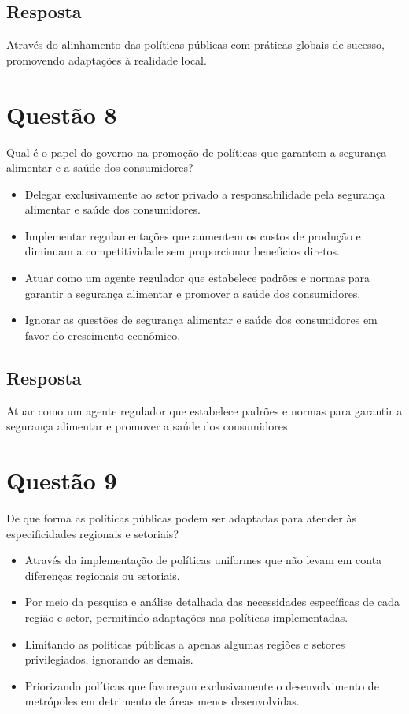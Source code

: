 \documentclass[
   article,       
   12pt,          
   oneside,       
   a4paper,       
   english,       
   brazil,        
   sumario=tradicional
   ]{abntex2}
\begin{document}
\subsection{Resposta}
Através do alinhamento das políticas públicas com práticas globais de sucesso, promovendo adaptações à realidade local.

\section{Questão 8}
Qual é o papel do governo na promoção de políticas que garantem a segurança alimentar e a saúde dos consumidores?

\begin{itemize}
  \item Delegar exclusivamente ao setor privado a responsabilidade pela segurança alimentar e saúde dos consumidores.
  \item Implementar regulamentações que aumentem os custos de produção e diminuam a competitividade sem proporcionar benefícios diretos.
  \item Atuar como um agente regulador que estabelece padrões e normas para garantir a segurança alimentar e promover a saúde dos consumidores.
  \item Ignorar as questões de segurança alimentar e saúde dos consumidores em favor do crescimento econômico.
\end{itemize}

\subsection{Resposta}
Atuar como um agente regulador que estabelece padrões e normas para garantir a segurança alimentar e promover a saúde dos consumidores.

\section{Questão 9}
De que forma as políticas públicas podem ser adaptadas para atender às especificidades regionais e setoriais?

\begin{itemize}
  \item Através da implementação de políticas uniformes que não levam em conta diferenças regionais ou setoriais.
  \item Por meio da pesquisa e análise detalhada das necessidades específicas de cada região e setor, permitindo adaptações nas políticas implementadas.
  \item Limitando as políticas públicas a apenas algumas regiões e setores privilegiados, ignorando as demais.
  \item Priorizando políticas que favoreçam exclusivamente o desenvolvimento de metrópoles em detrimento de áreas menos desenvolvidas.
\end{itemize}
\end{document}
